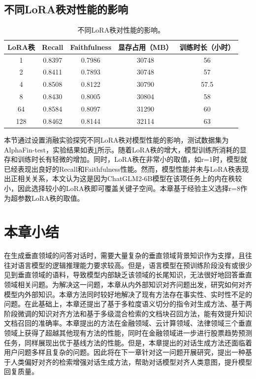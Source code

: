 \subsection{不同LoRA秩对性能的影响}

\begin{table}
	\caption{\label{lora_rank_ablation}不同LoRA秩对性能的影响。}
	\centering{}%
	\small
	\begin{tabular}{ccccc}
		\toprule[2pt]
		LoRA秩 & Recall & Faithfulness & 显存占用（MB） & 训练时长（小时） \\
		\hline
		1 & 0.8397 & 0.7986 & 30748 & 56 \\
		2 & 0.8411 & 0.7893 & 30748 & 57 \\
		4 & 0.8508 & 0.8122 & 30790 & 57.5 \\
		8 & 0.8430 & 0.8005 & 30804 & 58 \\
		64 & 0.8584 & 0.8097 & 31290 & 60 \\
		128 & 0.8462 & 0.8144 & 32114 & 63 \\
		\bottomrule[2pt]
	\end{tabular}
\end{table}

本节通过设置消融实验探究不同LoRA秩对模型性能的影响，测试数据集为AlphaFin-test，实验结果如表\ref{lora_rank_ablation}所示。随着LoRA秩的增大，模型训练所消耗的显存和训练时长有轻微的增加。同时，LoRA秩在非常小的取值，如r=1时，模型就已经表现出良好的Recall和Faithfulness性能。然而，模型性能并未与LoRA秩表现出正相关关系，本文认为这是因为ChatGLM2-6B模型在该项任务上的内在秩较小，因此选择较小的LoRA秩即可覆盖关键子空间。本章基于经验主义选择r=8作为超参数LoRA秩的取值。

\section{本章小结}

在生成垂直领域的问答对话时，需要大量复杂的垂直领域背景知识作为支撑，且往往对语言模型的逻辑推理能力要求较高。但是，语言模型在预训练阶段没有或很少见到垂直领域的语料，导致模型内部缺乏该领域的长尾知识，无法很好地回答垂直领域相关问题。为解决这一问题，本章从内外部知识对齐问题出发，研究如何对齐模型内外部知识。本章方法同时较好地解决了现有方法存在事实性、实时性不足的问题。在此基础上，本章还提出了基于多粒度语义切分的指令对生成方法、基于两阶段微调的知识对齐方法和基于多级混合检索的文档块召回方法，能有效提升知识文档召回的准确率。本章提出的方法在金融领域、云计算领域、法律领域三个垂直领域上获得了超越其他现有方法的性能，同时在金融领域进一步进行股票趋势预测任务，同样展现出优于基线方法的性能。但是，本章提出的对话生成方法还面临着用户问题多样且复杂的问题。因此将在下一章针对这一问题开展研究，提出一种基于人类偏好对齐的检索增强对话生成方法，帮助对话模型对齐人类意图，提升模型回复质量。